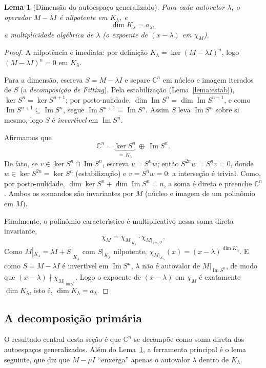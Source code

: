 \documentclass[11pt,a4paper]{amsart}
\newcommand{\C}{\mathbb{C}}
\newcommand{\img}{\operatorname{Im}}
\theoremstyle{plain}
\newtheorem{lema}[teorema]{Lema}
\theoremstyle{definition}
\theoremstyle{remark}
\begin{document}
\begin{lema}[Dimens\~ao do autoespa\c{c}o generalizado]\label{lema:dim}
Para cada autovalor $\lambda$, o operador $M-\lambda I$ \'e nilpotente em
$K_\lambda$, e
\[
  \dim K_\lambda = a_\lambda ,
\]
a multiplicidade alg\'ebrica de $\lambda$ (o expoente de $(x-\lambda)$ em
$\chi_M$).
\end{lema}

\begin{proof}
A nilpot\^encia \'e imediata: por defini\c{c}\~ao
$K_\lambda=\ker(M-\lambda I)^n$, logo $(M-\lambda I)^n=0$ em $K_\lambda$.

Para a dimens\~ao, escreva $S=M-\lambda I$ e separe $\C^n$ em n\'ucleo e imagem
iterados de $S$ (a \emph{decomposi\c{c}\~ao de Fitting}). Pela
estabiliza\c{c}\~ao (Lema~\ref{lema:estab}), $\ker S^n=\ker S^{n+1}$; por
posto-nulidade, $\dim\img S^n=\dim\img S^{n+1}$, e como
$\img S^{n+1}\subseteq\img S^n$, segue $\img S^{n+1}=\img S^n$. Assim $S$ leva
$\img S^n$ sobre si mesmo, logo $S$ \'e \emph{invert\'\i vel} em $\img S^n$.

Afirmamos que
\[
  \C^n = \underbrace{\ker S^n}_{=\,K_\lambda}\ \oplus\ \img S^n .
\]
De fato, se $v\in\ker S^n\cap\img S^n$, escreva $v=S^n w$; ent\~ao
$S^{2n}w=S^n v=0$, donde $w\in\ker S^{2n}=\ker S^n$ (estabiliza\c{c}\~ao) e
$v=S^n w=0$: a interse\c{c}\~ao \'e trivial. Como, por posto-nulidade,
$\dim\ker S^n+\dim\img S^n=n$, a soma \'e direta e preenche $\C^n$. Ambos os
somandos s\~ao invariantes por $M$ (n\'ucleo e imagem de um polin\^omio em $M$).

Finalmente, o polin\^omio caracter\'\i stico \'e multiplicativo nessa soma
direta invariante,
\[
  \chi_M = \chi_{M|_{K_\lambda}}\cdot \chi_{M|_{\img S^n}} .
\]
Como $M|_{K_\lambda}=\lambda I + S|_{K_\lambda}$ com $S|_{K_\lambda}$ nilpotente,
$\chi_{M|_{K_\lambda}}(x)=(x-\lambda)^{\dim K_\lambda}$. E como $S=M-\lambda I$
\'e invert\'\i vel em $\img S^n$, $\lambda$ n\~ao \'e autovalor de
$M|_{\img S^n}$, de modo que $(x-\lambda)\nmid\chi_{M|_{\img S^n}}$. Logo o
expoente de $(x-\lambda)$ em $\chi_M$ \'e exatamente $\dim K_\lambda$, isto \'e,
$\dim K_\lambda=a_\lambda$.
\end{proof}

\subsection{A decomposi\c{c}\~ao prim\'aria}

O resultado central desta se\c{c}\~ao \'e que $\C^n$ se decomp\~oe como soma
direta dos autoespa\c{c}os generalizados. Al\'em do Lema~\ref{lema:dim}, a
ferramenta principal \'e o lema seguinte, que diz que $M-\mu I$ ``enxerga''
apenas o autovalor $\lambda$ dentro de $K_\lambda$.
\end{document}
